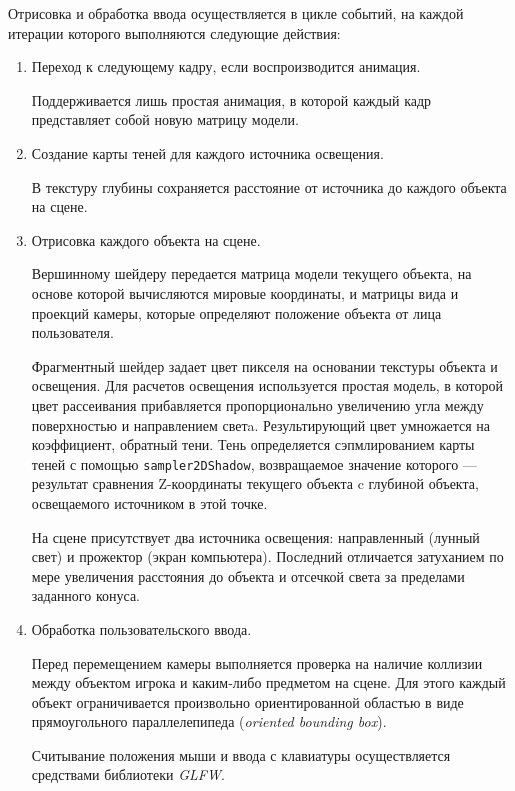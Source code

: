 \documentclass[listings]{labreport}
\begin{document}
Отрисовка и обработка ввода осуществляется в цикле событий, на каждой итерации которого
выполняются следующие действия:
\begin{enumerate}
  \item Переход к следующему кадру, если воспроизводится анимация.
    \vspace*{0.2em}

    {\small Поддерживается лишь простая анимация, в которой каждый кадр представляет собой новую матрицу модели.}

  \item Создание карты теней для каждого источника освещения.
    \vspace*{0.2em}

    {\small В текстуру глубины сохраняется расстояние от источника до каждого объекта на сцене.}

  \item Отрисовка каждого объекта на сцене.
    \vspace*{0.2em}

    {\small Вершинному шейдеру передается матрица модели текущего объекта, на основе которой вычисляются мировые координаты, и матрицы вида и проекций камеры, которые определяют положение объекта от лица пользователя.}

    \vspace*{0.2em}

    {\small Фрагментный шейдер задает цвет пикселя на основании текстуры объекта и освещения. Для расчетов освещения используется простая модель, в которой цвет рассеивания прибавляется пропорционально
    увеличению угла между поверхностью и направлением светa. Результирующий цвет умножается на коэффициент, обратный тени. Тень определяется сэпмлированием карты теней с помощью \texttt{sampler2DShadow},
    возвращаемое значение которого — результат сравнения Z-координаты текущего объекта c глубиной объекта, освещаемого источником в этой точке.}

    \vspace*{0.2em}

    {\small На сцене присутствует два источника освещения: направленный (лунный свет) и прожектор (экран компьютера). Последний отличается затуханием по мере увеличения расстояния до объекта и отсечкой света за пределами заданного конуса.}

  \item Обработка пользовательского ввода.

    {\small Перед перемещением камеры выполняется проверка на наличие коллизии между объектом игрока и каким-либо предметом на сцене. Для этого каждый объект ограничивается произвольно ориентированной областью
    в виде прямоугольного параллелепипеда (\textit{oriented bounding box}).}
  
    {\small Считывание положения мыши и ввода с клавиатуры осуществляется средствами библиотеки \textit{GLFW}.}
\end{enumerate}
\end{document}
